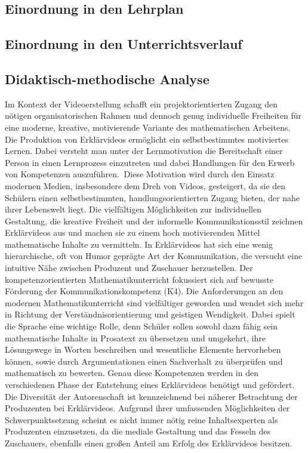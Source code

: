 \documentclass[a4paper,12pt,twoside=false]{scrartcl}
\begin{document}
\subsection{Einordnung in den Lehrplan}
\subsection{Einordnung in den Unterrichtsverlauf}
\subsection{Didaktisch-methodische Analyse}
Im Kontext der Videoerstellung schafft ein projektorientierten Zugang den nötigen organisatorischen Rahmen und dennoch genug individuelle Freiheiten für eine moderne, kreative, motivierende Variante des mathematischen Arbeitens. \cite{ISB05}\\
Die Produktion von Erklärvideos ermöglicht ein selbstbestimmtes motiviertes Lernen. Dabei versteht man unter der Lernmotivation \glqq die Bereitschaft einer Person in einen Lernprozess einzutreten und dabei Handlungen für den Erwerb von Kompetenzen auszuführen.\grqq $~$\cite{Slopinski} Diese Motivation wird durch den Einsatz modernen Medien, insbesondere dem Dreh von Videos, gesteigert, da sie den Schülern einen selbstbestimmten, handlungsorientierten Zugang bieten, der nahe ihrer Lebenswelt liegt. Die vielfältigen Möglichkeiten zur individuellen Gestaltung, die kreative Freiheit und der informelle Kommunikationsstil zeichnen Erklärvideos aus und machen sie zu einem hoch motivierenden Mittel mathematische Inhalte zu vermitteln. In Erklärvideos hat sich eine wenig hierarchische, oft von Humor geprägte Art der Kommunikation, die versucht eine intuitive Nähe zwischen Produzent und Zuschauer herzustellen. Der kompetenzorientierten Mathematikunterricht fokussiert sich auf bewusste Förderung der Kommunikationskompetenz (K4). Die Anforderungen an den modernen Mathematikunterricht sind vielfältiger geworden und wendet sich mehr in Richtung der Verständnisorientierung und geistigen Wendigkeit. Dabei spielt die Sprache eine wichtige Rolle, denn Schüler sollen sowohl dazu fähig sein mathematische Inhalte in Prosatext zu übersetzen und umgekehrt, ihre Lösungswege in Worten beschreiben und wesentliche Elemente hervorheben können, sowie durch Argumentationen einen Sachverhalt zu überprüfen und mathematisch zu bewerten. Genau diese Kompetenzen werden in den verschiedenen Phase der Entstehung eines Erklärvideos benötigt und gefördert. Die Diversität der Autorenschaft ist kennzeichnend bei näherer Betrachtung der Produzenten bei Erklärvideos. Aufgrund ihrer umfassenden Möglichkeiten der Schwerpunktsetzung scheint es nicht immer nötig reine Inhaltsexperten als Produzenten einzusetzen, da die mediale Gestaltung und das Fesseln des Zuschauers, ebenfalls einen großen Anteil am Erfolg des Erklärvideos besitzen. \\
\end{document}
